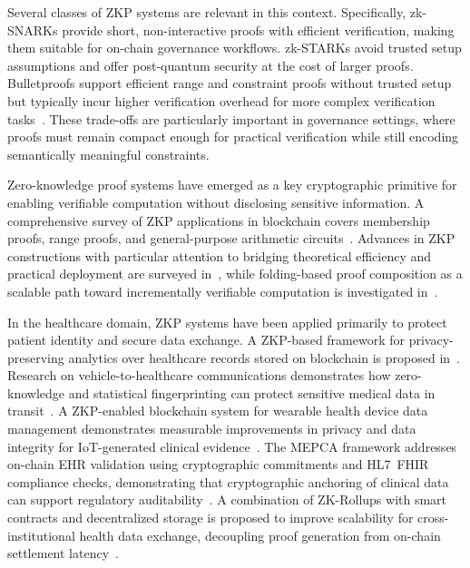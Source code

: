 \documentclass[journal]{IEEEtran}
\begin{document}
Several classes of ZKP systems are relevant in this context.
Specifically, zk-SNARKs provide short, non-interactive proofs with
efficient verification, making them suitable for on-chain governance
workflows. zk-STARKs avoid trusted setup assumptions and offer
post-quantum security at the cost of larger proofs. Bulletproofs
support efficient range and constraint proofs without trusted setup
but typically incur higher verification overhead for more complex
verification tasks~\cite{ouderoelink2024slr}. These trade-offs are
particularly important in governance settings, where proofs must
remain compact enough for practical verification while still encoding
semantically meaningful constraints.

Zero-knowledge proof systems have emerged as a key cryptographic
primitive for enabling verifiable computation without disclosing
sensitive information. A comprehensive survey of ZKP applications in
blockchain covers membership proofs, range proofs, and
general-purpose arithmetic circuits~\cite{Lavin2024}. Advances in ZKP
constructions with particular attention to bridging theoretical
efficiency and practical deployment are surveyed
in~\cite{xie2023advances}, while folding-based proof composition as a
scalable path toward incrementally verifiable computation is
investigated in~\cite{sakwa5293078survey}.

In the healthcare domain, ZKP systems have been applied primarily to
protect patient identity and secure data exchange. A ZKP-based
framework for privacy-preserving analytics over healthcare records
stored on blockchain is proposed in~\cite{babu2024secure}. Research
on vehicle-to-healthcare communications demonstrates how
zero-knowledge and statistical fingerprinting can protect sensitive
medical data in transit~\cite{9387630}. A ZKP-enabled blockchain
system for wearable health device data management demonstrates
measurable improvements in privacy and data integrity for
IoT-generated clinical evidence~\cite{khan2025leveraging}. The MEPCA
framework addresses on-chain EHR validation using cryptographic
commitments and HL7~FHIR compliance checks, demonstrating that
cryptographic anchoring of clinical data can support regulatory
auditability~\cite{da2025enhancing}. A combination of ZK-Rollups with
smart contracts and decentralized storage is proposed to improve
scalability for cross-institutional health data exchange, decoupling
proof generation from on-chain settlement latency~\cite{raghav2026secure}.
\end{document}
